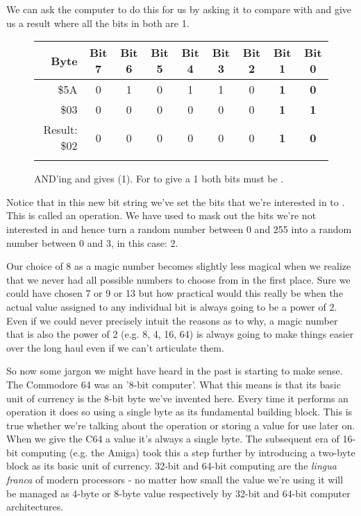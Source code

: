We can ask the
computer to do this for us by asking it to compare  with 
and give us a result where all the bits in both are 1.

\begin{figure}[H]
  {
    \setlength{\tabcolsep}{3.0pt}
    \setlength\cmidrulewidth{\heavyrulewidth} %
    \begin{adjustbox}{width=8cm,center}

      \begin{tabular}{rcccccccc}
        \toprule
        Byte & Bit 7 & Bit 6 & Bit 5 & Bit 4 & Bit 3 & Bit 2 & Bit 1 & Bit 0        \\
        \midrule
        \$5A & 0 & 1 & 0 & 1 & 1 & 0 & \textbf{1} & \textbf{0} \\
        \$03 & 0 & 0 & 0 & 0 & 0 & 0 & \textbf{1} & \textbf{1} \\
        \midrule
        Result: \$02 & 0 & 0 & 0 & 0 & 0 & 0 & \textbf{1} & \textbf{0}\\
        \addlinespace
        \bottomrule
      \end{tabular}
    \end{adjustbox}
  }\caption*{AND'ing  and  gives  (1). For  to give a 1 both bits must be .}
\end{figure}


Notice that in this new bit string we've set the bits that we're interested in
to .  This is called an  operation. We have used
 to mask out the bits we're not interested in and hence turn a
random number between 0 and 255 into a random number between 0 and 3, in this case: 2.

Our choice of 8 as a magic number becomes slightly less magical when we realize
that we never had all possible numbers to choose from in the first place. Sure
we could have chosen 7 or 9 or 13 but how practical would this really be when
the actual value assigned to any individual bit is always going to be a power of
2. Even if we could never precisely intuit the reasons as to why, a magic number
that is also the power of 2 (e.g. 8, 4, 16, 64) is always going to make things easier
over the long haul even if we can't articulate them.

So now some jargon we might have heard in the past is starting to make sense. The
Commodore 64 was an '8-bit computer'. What this means is that its basic unit of
currency is the 8-bit byte we've invented here. Every time it performs an operation
it does so using a single byte as its fundamental building block. This is true 
whether we're talking about the  operation or storing a value for use
later on. When we give the C64 a value it's always a single byte. The subsequent
era of 16-bit computing (e.g. the Amiga) took this a step further by introducing
a two-byte block as its basic unit of currency. 32-bit and 64-bit computing are the
\textit{lingua franca} of modern processors - no matter how small the value we're using it
will be managed as 4-byte or 8-byte value respectively by 32-bit and 64-bit
computer architectures.

